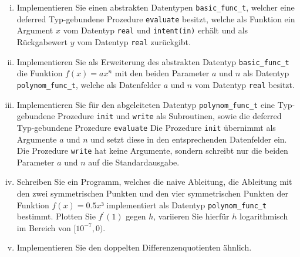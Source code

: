 \begin{question}[subtitle=Numerische Differentiation]
\begin{enumerate}[(i)]
\item Implementieren Sie einen abstrakten Datentypen \texttt{basic_func_t}, welcher eine deferred Typ-gebundene Prozedure \texttt{evaluate} besitzt, welche als Funktion ein Argument $x$ vom Datentyp \texttt{real} und \texttt{intent(in)} erhält und als Rückgabewert $y$ vom Datentyp \texttt{real} zurückgibt.
\item Implementieren Sie als Erweiterung des abstrakten Datentyp \texttt{basic_func_t} die Funktion $f(x) = ax^n$ mit den beiden Parameter $a$ und $n$ als Datentyp \texttt{polynom_func_t}, welche als Datenfelder $a$ und $n$ vom Datentyp \texttt{real} besitzt.
\item Implementieren Sie für den abgeleiteten Datentyp \texttt{polynom_func_t} eine Typ-gebundene Prozedure \texttt{init} und \texttt{write} als Subroutinen, sowie die deferred Typ-gebundene Prozedure \texttt{evaluate}
  Die Prozedure \texttt{init} übernimmt als Argumente $a$ und $n$ und setzt diese in den entsprechenden Datenfelder ein.
  Die Prozedure \texttt{write} hat keine Argumente, sondern schreibt nur die beiden Parameter $a$ und $n$ auf die Standardausgabe.
\item Schreiben Sie ein Programm, welches die naive Ableitung, die Ableitung mit den zwei symmetrischen Punkten und den vier symmetrischen Punkten der Funktion $f(x) = 0.5 x³$ implementiert als Datentyp \texttt{polynom_func_t} bestimmt.
  Plotten Sie $f^{\prime}(1)$ gegen $h$, variieren Sie hierfür $h$ logarithmisch im Bereich von $[10^{-7}, 0)$.
\item Implementieren Sie den doppelten Differenzenquotienten ähnlich.
\end{enumerate}
\end{question}

